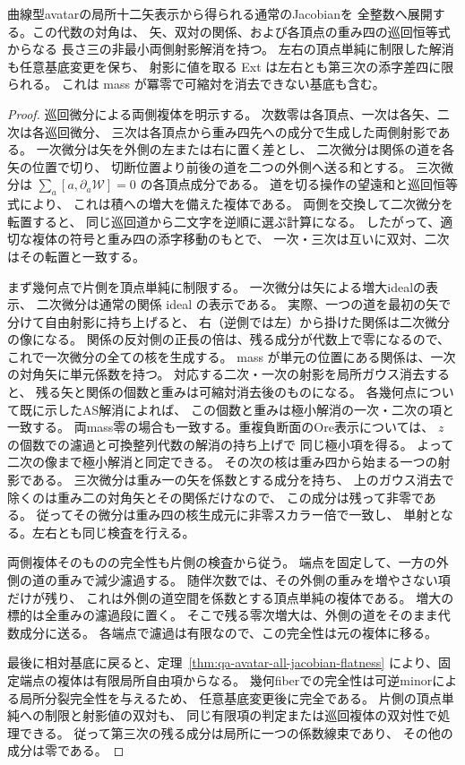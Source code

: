 \begin{theorem}[全曲線型avatarの相対巡回射影解消]
\label{thm:qa-avatar-relative-cyclic-resolution}
曲線型avatarの局所十二矢表示から得られる通常のJacobianを
全整数へ展開する。この代数の対角は、
矢、双対の関係、および各頂点の重み四の巡回恒等式からなる
長さ三の非最小両側射影解消を持つ。
左右の頂点単純に制限した解消も任意基底変更を保ち、
射影に値を取る Ext は左右とも第三次の添字差四に限られる。
これは mass が冪零で可縮対を消去できない基底も含む。
\end{theorem}
\begin{proof}
巡回微分による両側複体を明示する。
次数零は各頂点、一次は各矢、二次は各巡回微分、
三次は各頂点から重み四先への成分で生成した両側射影である。
一次微分は矢を外側の左または右に置く差とし、
二次微分は関係の道を各矢の位置で切り、
切断位置より前後の道を二つの外側へ送る和とする。
三次微分は
$\sum_a[a,\partial_a\mathcal W]=0$ の各頂点成分である。
道を切る操作の望遠和と巡回恒等式により、
これは積への増大を備えた複体である。
両側を交換して二次微分を転置すると、
同じ巡回道から二文字を逆順に選ぶ計算になる。
したがって、適切な複体の符号と重み四の添字移動のもとで、
一次・三次は互いに双対、二次はその転置と一致する。

まず幾何点で片側を頂点単純に制限する。
一次微分は矢による増大idealの表示、
二次微分は通常の関係 ideal の表示である。
実際、一つの道を最初の矢で分けて自由射影に持ち上げると、
右（逆側では左）から掛けた関係は二次微分の像になる。
関係の反対側の正長の倍は、残る成分が代数上で零になるので、
これで一次微分の全ての核を生成する。
mass が単元の位置にある関係は、一次の対角矢に単元係数を持つ。
対応する二次・一次の射影を局所ガウス消去すると、
残る矢と関係の個数と重みは可縮対消去後のものになる。
各幾何点について既に示したAS解消によれば、
この個数と重みは極小解消の一次・二次の項と一致する。
両mass零の場合も一致する。重複負断面のOre表示については、
$z$ の個数での濾過と可換整列代数の解消の持ち上げで
同じ極小項を得る。
よって二次の像まで極小解消と同定できる。
その次の核は重み四から始まる一つの射影である。
三次微分は重み一の矢を係数とする成分を持ち、
上のガウス消去で除くのは重み二の対角矢とその関係だけなので、
この成分は残って非零である。
従ってその微分は重み四の核生成元に非零スカラー倍で一致し、
単射となる。左右とも同じ検査を行える。

両側複体そのものの完全性も片側の検査から従う。
端点を固定して、一方の外側の道の重みで減少濾過する。
随伴次数では、その外側の重みを増やさない項だけが残り、
これは外側の道空間を係数とする頂点単純の複体である。
増大の標的は全重みの濾過段に置く。
そこで残る零次増大は、外側の道をそのまま代数成分に送る。
各端点で濾過は有限なので、この完全性は元の複体に移る。

最後に相対基底に戻ると、定理~\ref{thm:qa-avatar-all-jacobian-flatness}
により、固定端点の複体は有限局所自由項からなる。
幾何fiberでの完全性は可逆minorによる局所分裂完全性を与えるため、
任意基底変更後に完全である。
片側の頂点単純への制限と射影値の双対も、
同じ有限項の判定または巡回複体の双対性で処理できる。
従って第三次の残る成分は局所に一つの係数線束であり、
その他の成分は零である。
\end{proof}

